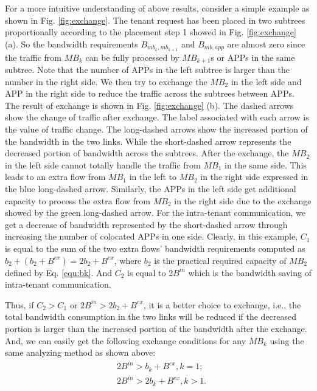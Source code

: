 \documentclass[review]{elsarticle}
\begin{document}
For a more intuitive understanding of above results, consider a simple example as shown in Fig. \ref{fig:exchange}. The tenant request has been placed in two subtrees proportionally according to the placement step 1 showed in Fig. \ref{fig:exchange} (a). So the bandwidth requirements $B_{mb_k,mb_{k+1}}$ and $B_{mb,app}$ are almost zero since the traffic from $MB_k$ can be fully processed by $MB_{k+1}$s or APPs in the same subtree. Note that the number of APPs in the left subtree is larger than the number in the right side. We then try to exchange the $MB_2$ in the left side and APP in the right side to reduce the traffic across the subtrees between APPs. The result of exchange is shown in Fig. \ref{fig:exchange} (b). The dashed arrows show the change of traffic after exchange. The label associated with each arrow is the value of traffic change. %
 The long-dashed arrows show the increased portion of the bandwidth in the two links. While the short-dashed arrow represents the decreased portion of bandwidth across the subtrees. After the exchange, the $MB_2$ in the left side cannot totally handle the traffic from $MB_1$ in the same side. This leads to an extra flow from $MB_1$ in the left to $MB_2$ in the right side expressed in the blue long-dashed arrow. Similarly, the APPs in the left side get additional capacity to process the extra flow from $MB_2$ in the right side due to the exchange showed by the green long-dashed arrow. For the intra-tenant communication, we get a decrease of bandwidth represented by the short-dashed arrow through increasing the number of colocated APPs in one side. Clearly, in this example, $C_1$ is equal to the sum of the two extra flows' bandwidth requirements computed as $b_2+(b_2+B^{ex})=2b_2+B^{ex}$, where $b_2$ is the practical required capacity of $MB_2$ defined by Eq. \ref{equ:bk}. And $C_2$ is equal to $2B^{in}$ which is the bandwidth saving of intra-tenant communication. 

Thus, if $C_2>C_1$ or $2B^{in} > 2b_2 + B^{ex}$, it is a better choice to exchange, i.e., the total bandwidth consumption in the two links will be reduced if the decreased portion is larger than the increased portion of the bandwidth after the exchange. And, we can easily get the following exchange conditions for any $MB_k$ using the same analyzing method as shown above: 
\begin{equation}
\begin{aligned}
&2B^{in}>b_k+B^{ex},k=1;\\
&2B^{in}>2b_k+B^{ex},k>1.
\end{aligned}
\end{equation}
\end{document}
